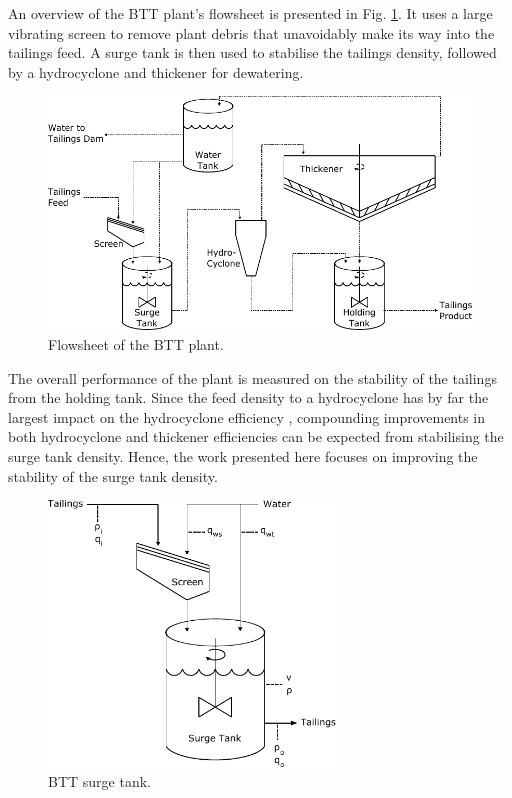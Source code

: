 \documentclass[preprint,authoryear,12pt]{elsarticle}
\begin{document}
An overview of the BTT plant's flowsheet is presented in Fig. \ref{fig:BTTFlowSheet}. It uses a large vibrating screen to remove plant debris that unavoidably make its way into the tailings feed. A surge tank is then used to stabilise the tailings density, followed by a hydrocyclone and thickener for dewatering. 

\begin{figure}[b!]
	\centering
	\includegraphics[width=5.2in]{BTTDetailed.pdf}
	\caption{Flowsheet of the BTT plant.}
	\label{fig:BTTFlowSheet}
\end{figure}


The overall performance of the plant is measured on the stability of the tailings from the holding tank. Since the feed density to a hydrocyclone has by far the largest impact on the hydrocyclone efficiency \citep{Ntengwe2011}, compounding improvements in both hydrocyclone and thickener efficiencies can be expected from stabilising the surge tank density. Hence, the work presented here focuses on improving the stability of the surge tank density. 

\begin{figure}[t!]
	\centering
	\includegraphics[width=3in]{SurgeTankDrawingNew.pdf}
	\caption{BTT surge tank.}
	\label{fig:BTTSurgeTank}
\end{figure}
\end{document}
